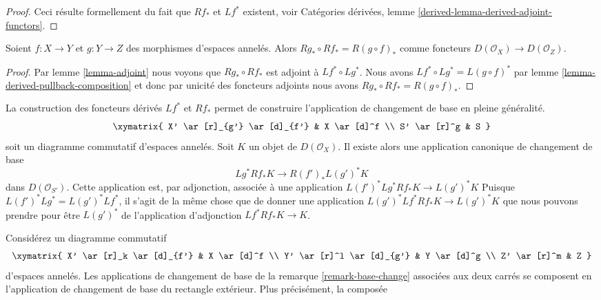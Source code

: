 {\begin{proof}
Ceci résulte formellement du fait que $Rf_*$ et $Lf^*$ existent, voir Catégories dérivées, lemme \ref{derived-lemma-derived-adjoint-functors}.
\end{proof}

\begin{lemma}

\label{lemma-derived-pushforward-composition}
Soient $f : X \to Y$ et $g : Y \to Z$ des morphismes d'espaces annelés. Alors $Rg_* \circ Rf_* = R(g \circ f)_*$ comme foncteurs $D(\mathcal{O}_X) \to D(\mathcal{O}_Z)$.
\end{lemma}

\begin{proof}
Par lemme \ref{lemma-adjoint} nous voyons que $Rg_* \circ Rf_*$ est adjoint à $Lf^* \circ Lg^*$. Nous avons $Lf^* \circ Lg^* = L(g \circ f)^*$ par lemme \ref{lemma-derived-pullback-composition} et donc par unicité des foncteurs adjoints nous avons $Rg_* \circ Rf_* = R(g \circ f)_*$.
\end{proof}

\begin{remark}

\label{remark-base-change}

La construction des foncteurs dérivés $Lf^*$ et $Rf_*$
permet de construire l'application de changement de base en pleine généralité.
$$
\xymatrix{
X' \ar[r]_{g'} \ar[d]_{f'} &
X \ar[d]^f \\
S' \ar[r]^g &
S
}
$$
soit un diagramme commutatif d'espaces annelés. Soit $K$ un objet de
$D(\mathcal{O}_X)$. Il existe alors une application canonique de changement de base
$$
Lg^*Rf_*K \longrightarrow R(f')_*L(g')^*K
$$
dans $D(\mathcal{O}_{S'})$. Cette application est, par adjonction, associée à une application
$L(f')^*Lg^*Rf_*K \to L(g')^*K$
Puisque $L(f')^*Lg^* = L(g')^*Lf^*$, il s'agit de la même chose que de donner une application
$L(g')^*Lf^*Rf_*K \to L(g')^*K$
que nous pouvons prendre pour être $L(g')^*$ de l'application d'adjonction
$Lf^*Rf_*K \to K$.

\end{remark}

\begin{remark}

\label{remark-compose-base-change}

Considérez un diagramme commutatif
$$
\xymatrix{
X' \ar[r]_k \ar[d]_{f'} & X \ar[d]^f \\
Y' \ar[r]^l \ar[d]_{g'} & Y \ar[d]^g \\
Z' \ar[r]^m & Z
}
$$
d'espaces annelés. Les applications de changement de base de la remarque \ref{remark-base-change}
associées aux deux carrés se composent en l'application de changement de base du rectangle extérieur. Plus précisément, la composée


\end{remark}}
